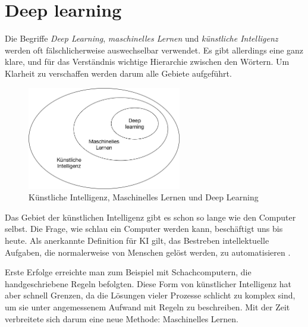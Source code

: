 \section{Deep learning}
Die Begriffe \textit{Deep Learning}, \textit{maschinelles Lernen} und \textit{künstliche Intelligenz} werden oft fälschlicherweise auswechselbar verwendet. Es gibt allerdings eine ganz klare, und für das Verständnis wichtige Hierarchie zwischen den Wörtern. Um Klarheit zu verschaffen werden darum alle Gebiete aufgeführt.

\begin{figure}[hbt]
	\centering
		\includegraphics[width=0.6\textwidth]{assets/hierarchy.png}
	\caption{Künstliche Intelligenz, Maschinelles Lernen und Deep Learning}
	\label{img:hierarchy}
\end{figure}

Das Gebiet der künstlichen Intelligenz gibt es schon so lange wie den Computer selbst. Die Frage, wie schlau ein Computer werden kann, beschäftigt uns bis heute. Als anerkannte Definition für KI gilt, das Bestreben intellektuelle Aufgaben, die normalerweise von Menschen gelöst werden, zu automatisieren \parencite[][Kap. 1.1.1]{chollet}.

Erste Erfolge erreichte man zum Beispiel mit Schachcomputern, die handgeschriebene Regeln befolgten. Diese Form von künstlicher Intelligenz hat aber schnell Grenzen, da die Lösungen vieler Prozesse schlicht zu komplex sind, um sie unter angemessenem Aufwand mit Regeln zu beschreiben. Mit der Zeit verbreitete sich darum eine neue Methode: Maschinelles Lernen. \parencite[vgl. ][Kap. 1.1.1]{chollet}

